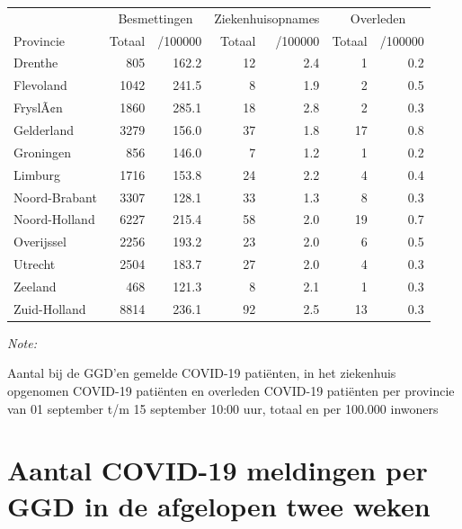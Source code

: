 \documentclass[
  english,
  man,floatsintext]{apa6}
\begin{document}
\begin{table}
\centering
\begin{threeparttable}
\begin{tabular}{lrrrrrr}
\toprule
\multicolumn{1}{c}{ } & \multicolumn{2}{c}{Besmettingen} & \multicolumn{2}{c}{Ziekenhuisopnames} & \multicolumn{2}{c}{Overleden} \\
\cmidrule(l{3pt}r{3pt}){2-3} \cmidrule(l{3pt}r{3pt}){4-5} \cmidrule(l{3pt}r{3pt}){6-7}
Provincie & Totaal & /100000 & Totaal & /100000 & Totaal & /100000\\
\midrule
Drenthe & 805 & 162.2 & 12 & 2.4 & 1 & 0.2\\
Flevoland & 1042 & 241.5 & 8 & 1.9 & 2 & 0.5\\
FryslÃ¢n & 1860 & 285.1 & 18 & 2.8 & 2 & 0.3\\
Gelderland & 3279 & 156.0 & 37 & 1.8 & 17 & 0.8\\
Groningen & 856 & 146.0 & 7 & 1.2 & 1 & 0.2\\
Limburg & 1716 & 153.8 & 24 & 2.2 & 4 & 0.4\\
Noord-Brabant & 3307 & 128.1 & 33 & 1.3 & 8 & 0.3\\
Noord-Holland & 6227 & 215.4 & 58 & 2.0 & 19 & 0.7\\
Overijssel & 2256 & 193.2 & 23 & 2.0 & 6 & 0.5\\
Utrecht & 2504 & 183.7 & 27 & 2.0 & 4 & 0.3\\
Zeeland & 468 & 121.3 & 8 & 2.1 & 1 & 0.3\\
Zuid-Holland & 8814 & 236.1 & 92 & 2.5 & 13 & 0.3\\
\bottomrule
\end{tabular}
\begin{tablenotes}
\item \textit{Note: } 
\item Aantal bij de GGD’en gemelde COVID-19 patiënten, in het ziekenhuis opgenomen COVID-19 patiënten en overleden COVID-19 patiënten per provincie van 01 september t/m 15 september 10:00 uur, totaal en per 100.000 inwoners
\end{tablenotes}
\end{threeparttable}
\end{table}

\newpage

\hypertarget{aantal-covid-19-meldingen-per-ggd-in-de-afgelopen-twee-weken}{%
\section{Aantal COVID-19 meldingen per GGD in de afgelopen twee weken}\label{aantal-covid-19-meldingen-per-ggd-in-de-afgelopen-twee-weken}}
\end{document}
